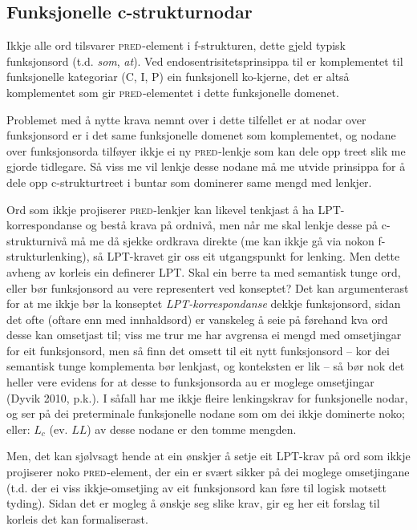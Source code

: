\documentclass[12pt,a4paper,oneside,draft]{report}
\newcommand{\F}[2]{\textsc{#1}\ensuremath{_{#2}}}
\newcommand{\PRED}{\F{pred}{}}
\begin{document}
\subsection{Funksjonelle c\hyp{}strukturnodar}
\label{sec-3.7.3}

\label{SEC:fnord}

Ikkje alle ord tilsvarer \PRED{}-element i f\hyp{}strukturen, dette gjeld
 typisk funksjonsord (t.d. \emph{som}, \emph{at}). Ved endosentrisitetsprinsippa
 til \citet{bresnan2001lfs} er komplementet til funksjonelle
 kategoriar (C, I, P) ein funksjonell ko-kjerne, det er altså
 komplementet som gir \PRED{}-elementet i dette funksjonelle domenet.

Problemet med å nytte krava nemnt over i dette tilfellet er at nodar
 over funksjonsord er i det same funksjonelle domenet som
 komplementet, og nodane over funksjonsorda tilføyer ikkje ei ny
 \PRED{}-lenkje som kan dele opp treet slik me gjorde tidlegare. Så
 viss me vil lenkje desse nodane må me utvide prinsippa for å dele opp
 c\hyp{}strukturtreet i buntar som dominerer same mengd med lenkjer.

Ord som ikkje projiserer \PRED{}-lenkjer kan likevel tenkjast å ha
 LPT\hyp{}korrespondanse og bestå krava på ordnivå, men når me skal lenkje
 desse på c\hyp{}strukturnivå må me då sjekke ordkrava direkte (me kan
 ikkje gå via nokon f\hyp{}strukturlenking), så LPT-kravet gir oss eit
 utgangspunkt for lenking. Men dette avheng av korleis ein definerer
 LPT. Skal ein berre ta med semantisk tunge ord, eller bør
 funksjonsord au vere representert ved konseptet? Det kan
 argumenterast for at me ikkje bør la konseptet \emph{LPT\hyp{}korrespondanse}
 dekkje funksjonsord, sidan det ofte (oftare enn med innhaldsord) er
 vanskeleg å seie på førehand kva ord desse kan omsetjast til; viss me
 trur me har avgrensa ei mengd med omsetjingar for eit funksjonsord,
 men så finn det omsett til eit nytt funksjonsord -- kor dei semantisk
 tunge komplementa bør lenkjast, og konteksten er lik -- så bør nok
 det heller vere evidens for at desse to funksjonsorda au er moglege
 omsetjingar (Dyvik 2010, p.k.).  I såfall har me ikkje fleire
 lenkingskrav for funksjonelle nodar, og ser på dei preterminale
 funksjonelle nodane som om dei ikkje dominerte noko; eller: $L_c$
 (ev. $LL$) av desse nodane er den tomme mengden.

Men, det kan sjølvsagt hende at ein ønskjer å setje eit LPT-krav på
 ord som ikkje projiserer noko \PRED{}-element, der ein er svært
 sikker på dei moglege omsetjingane (t.d. der ei viss ikkje-omsetjing
 av eit funksjonsord kan føre til logisk motsett tyding). Sidan det er
 mogleg å ønskje seg slike krav, gir eg her eit forslag til korleis
 det kan formaliserast.
\end{document}
